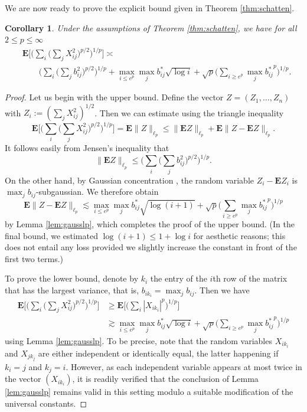 \documentclass[10pt,reqno]{amsart}
\newtheorem{cor}[thm]{Corollary}
\theoremstyle{definition}
\numberwithin{equation}{section}
\numberwithin{figure}{section}
\numberwithin{table}{section}
\begin{document}
We are now ready to prove the explicit bound given in Theorem 
\ref{thm:schatten}.

\begin{cor}
\label{cor:expl}
Under the assumptions of Theorem \ref{thm:schatten}, we have for all
$2\le p\le\infty$
\begin{align*}
	&\mathbf{E}\Bigg[
	\Bigg(\sum_i\Bigg(\sum_j X_{ij}^2\Bigg)^{p/2}\Bigg)^{1/p}
	\Bigg] \asymp \mbox{} 
	\\
	&\qquad
	\Bigg(\sum_i\Bigg(\sum_j b_{ij}^2\Bigg)^{p/2}\Bigg)^{1/p} +
	\max_{i\le e^p}\max_j b_{ij}^*\sqrt{\log i} +
	\sqrt{p}\Bigg(
	\sum_{i\ge e^p}\max_j {b_{ij}^{*}}^p
	\Bigg)^{1/p}.
\end{align*}
\end{cor}

\begin{proof}
Let us begin with the upper bound. Define the vector
$Z=(Z_1,\ldots,Z_n)$ with $Z_i := (\sum_j X_{ij}^2)^{1/2}$.
Then we can estimate using the triangle inequality
$$
	\mathbf{E}\Bigg[ 
        \Bigg(\sum_i\Bigg(\sum_j X_{ij}^2\Bigg)^{p/2}\Bigg)^{1/p}
        \Bigg] =
	\mathbf{E}\|Z\|_{\ell_p}
	\le
	\|\mathbf{E}Z\|_{\ell_p} +
	\mathbf{E}\|Z-\mathbf{E}Z\|_{\ell_p}.
$$
It follows easily from Jensen's inequality that
$$
	\|\mathbf{E}Z\|_{\ell_p}  \le
	\Bigg(\sum_i\Bigg(\sum_j b_{ij}^2\Bigg)^{p/2}\Bigg)^{1/p}.
$$
On the other hand, by Gaussian concentration \cite[Theorem
5.8]{BLM13}, the random 
variable $Z_i-\mathbf{E}Z_i$ is $\max_j b_{ij}$-subgaussian. We 
therefore obtain
$$
	\mathbf{E}\|Z-\mathbf{E}Z\|_{\ell_p} \lesssim
	\max_{i\le e^p}\max_j b_{ij}^*\sqrt{\log(i+1)} +
	\sqrt{p}\Bigg(
	\sum_{i\ge e^p}\max_j {b_{ij}^{*}}^p
	\Bigg)^{1/p}
$$
by Lemma \ref{lem:gausslp}, which completes the proof of the upper bound. 
(In the final bound, we estimated $\log(i+1)\le 1+\log i$ for aesthetic 
reasons; this does not entail any loss provided we slightly increase
the constant in front of the first two terms.)

To prove the lower bound, denote by $k_i$ the entry of the $i$th row of 
the matrix that has the largest variance, that is, $b_{ik_i}=\max_jb_{ij}$.
Then we have
\begin{align*}
	\mathbf{E}\Bigg[ 
        \Bigg(\sum_i\Bigg(\sum_j X_{ij}^2\Bigg)^{p/2}\Bigg)^{1/p}
        \Bigg] &\ge
	\mathbf{E}\Bigg[ 
        \Bigg(\sum_i|X_{ik_i}|^p\Bigg)^{1/p}
        \Bigg] \\ &\gtrsim
        \max_{i\le e^p}\max_j b_{ij}^*\sqrt{\log i} +
        \sqrt{p}\Bigg(
        \sum_{i\ge e^p}\max_j {b_{ij}^{*}}^p
        \Bigg)^{1/p}
\end{align*}
using Lemma \ref{lem:gausslp}. To be precise, note that the random 
variables $X_{ik_i}$ and $X_{jk_j}$ are either independent or identically 
equal, the latter happening if $k_i=j$ and $k_j=i$. However, as each 
independent variable appears at most twice in the vector $(X_{ik_i})$, it 
is readily verified that the conclusion of Lemma \ref{lem:gausslp} remains 
valid in this setting modulo a suitable modification of the universal 
constants.


\end{proof}
\end{document}
